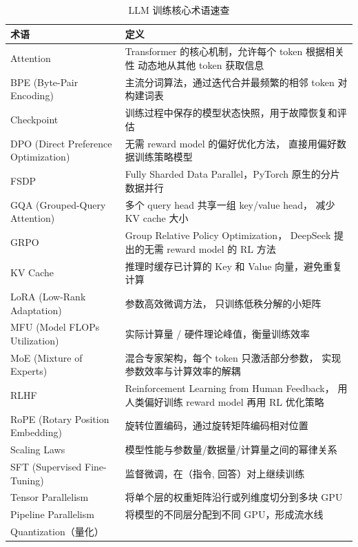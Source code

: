 \begin{table}[H]
\centering\small
\renewcommand{\arraystretch}{1.3}
\caption{LLM 训练核心术语速查}\label{tab:glossary}
\begin{tabularx}{\linewidth}{l >{\raggedright\arraybackslash}X}
\toprule
\rowcolor{figLightGray}
\textbf{术语} & \textbf{定义} \\
\midrule
Attention &
  Transformer 的核心机制，允许每个 token 根据相关性
  动态地从其他 token 获取信息 \\
BPE (Byte-Pair Encoding) &
  主流分词算法，通过迭代合并最频繁的相邻 token 对构建词表 \\
Checkpoint &
  训练过程中保存的模型状态快照，用于故障恢复和评估 \\
DPO (Direct Preference Optimization) &
  无需 reward model 的偏好优化方法，
  直接用偏好数据训练策略模型~\cite{rafailov2023dpo} \\
FSDP &
  Fully Sharded Data Parallel，PyTorch 原生的分片数据并行 \\
GQA (Grouped-Query Attention) &
  多个 query head 共享一组 key/value head，
  减少 KV cache 大小 \\
GRPO &
  Group Relative Policy Optimization，
  DeepSeek 提出的无需 reward model 的 RL 方法~\cite{shao2024grpo} \\
KV Cache &
  推理时缓存已计算的 Key 和 Value 向量，避免重复计算 \\
LoRA (Low-Rank Adaptation) &
  参数高效微调方法，
  只训练低秩分解的小矩阵~\cite{hu2021lora} \\
MFU (Model FLOPs Utilization) &
  实际计算量 / 硬件理论峰值，衡量训练效率 \\
MoE (Mixture of Experts) &
  混合专家架构，每个 token 只激活部分参数，
  实现参数效率与计算效率的解耦 \\
RLHF &
  Reinforcement Learning from Human Feedback，
  用人类偏好训练 reward model 再用 RL 优化策略~\cite{ouyang2022rlhf} \\
RoPE (Rotary Position Embedding) &
  旋转位置编码，通过旋转矩阵编码相对位置~\cite{su2021rope} \\
Scaling Laws &
  模型性能与参数量/数据量/计算量之间的幂律关系~\cite{kaplan2020scaling} \\
SFT (Supervised Fine-Tuning) &
  监督微调，在（指令, 回答）对上继续训练 \\
Tensor Parallelism &
  将单个层的权重矩阵沿行或列维度切分到多块 GPU \\
Pipeline Parallelism &
  将模型的不同层分配到不同 GPU，形成流水线 \\
Quantization（量化） &

\end{tabularx}
\end{table}
